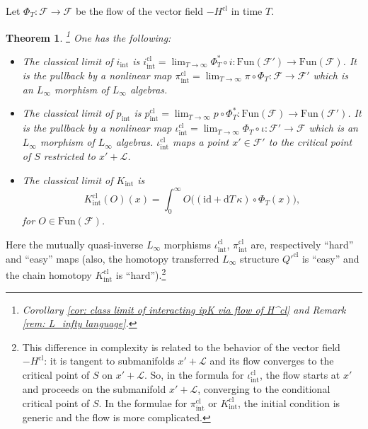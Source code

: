 \documentclass{amsart}
\theoremstyle{plain} %
\newtheorem{introthm}{Theorem}
\theoremstyle{definition}
\theoremstyle{remark}
\newcommand{\mr}{\mathrm}
\newcommand{\ra}{\rightarrow}
\newcommand{\F}{\mathcal{F}}
\newcommand{\LL}{\mathcal{L}}
\newcommand{\ii}{\mathrm{int}}
\newcommand{\cl}{\mathrm{cl}}
\newcommand{\dr}{\mathrm{d}}
\begin{document}
Let $\Phi_T\colon \F\ra \F$ be the flow of the vector field $-H^\cl$ in time $T$. 
\begin{introthm}\!\!\!\footnote{Corollary \ref{cor: class limit of interacting ipK via flow of H^cl} and Remark \ref{rem: L_infty language}. }
\label{intro thm D}
One has the following:
    \begin{itemize}
        \item The classical limit of $i_\ii$ is $i_\ii^\cl=\lim_{T\ra\infty} \Phi_T^*\circ i \colon \mr{Fun}(\F')\ra \mr{Fun}(\F)$. It is the pullback by a nonlinear map $\pi^\cl_\ii=\lim_{T\ra\infty} \pi\circ \Phi_T \colon \F\ra \F'$ which is an $L_\infty$ morphism of $L_\infty$ algebras. 
    \item The classical limit of $p_\ii$ is $p_\ii^\cl=\lim_{T\ra\infty} p\circ \Phi_T^* \colon \mr{Fun}(\F)\ra \mr{Fun}(\F') $. It is the pullback by a nonlinear map $\iota_\ii^\cl =\lim_{T\ra\infty} \Phi_T\circ\iota \colon \F'\ra \F$ which is an $L_\infty$ morphism of $L_\infty$ algebras. $\iota_\ii^\cl$ maps  a point $x'\in \F'$ to the critical point of $S$ restricted to $x'+\LL$.
    \item The classical limit of $K_\ii$ is
    \begin{equation}
        K_\ii^\cl(O)(x)=\int_0^\infty O\big((\mr{id}+\dr T\,\kappa)\circ\Phi_T(x)\big),
    \end{equation}
    for $O\in \mr{Fun}(\F)$.
    \end{itemize}
\end{introthm}

Here the mutually quasi-inverse $L_\infty$ morphisms $\iota_\ii^\cl$, $\pi_\ii^\cl$ are, respectively ``hard'' and ``easy'' maps (also, the homotopy transferred $L_\infty$ structure $Q'^\cl$ is ``easy'' and the chain homotopy $K_\ii^\cl$ is ``hard'').\footnote{This difference in complexity is related to the behavior of the vector field $-H^\cl$: it is tangent to submanifolds $x'+\LL$ and its flow converges to the critical point of $S$ on $x'+\LL$.
So, in the formula for $\iota_\ii^\cl$, the flow starts at $x'$ and proceeds on the submanifold  $x'+\LL$, converging to the conditional critical point of $S$. In the formulae for $\pi_\ii^\cl$ or $K_\ii^\cl$, the initial condition is generic and the flow is more complicated.
}
\end{document}
